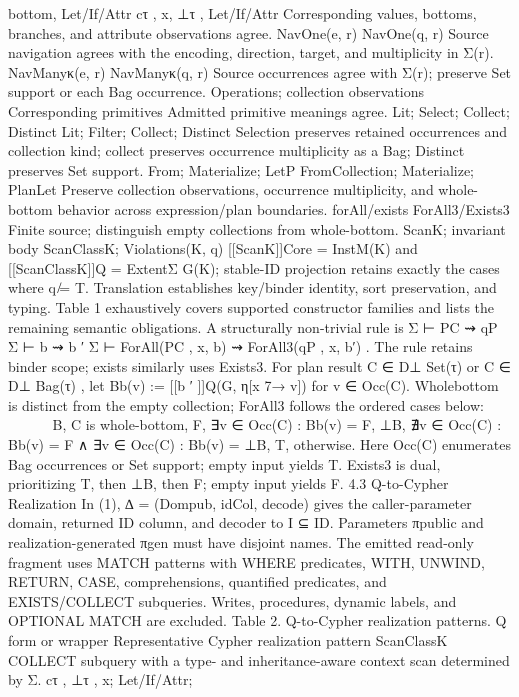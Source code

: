 bottom, Let/If/Attr
cτ , x, ⊥τ , Let/If/Attr Corresponding values, bottoms, branches, and attribute
observations agree.
NavOne(e, r) NavOne(q, r) Source navigation agrees with the encoding, direction, target,
and multiplicity in Σ(r).
NavManyκ(e, r) NavManyκ(q, r) Source occurrences agree with Σ(r); preserve Set support or
each Bag occurrence.
Operations; collection
observations
Corresponding primitives Admitted primitive meanings agree.
Lit; Select; Collect;
Distinct
Lit; Filter; Collect;
Distinct
Selection preserves retained occurrences and collection kind;
collect preserves occurrence multiplicity as a Bag; Distinct
preserves Set support.
From; Materialize; LetP FromCollection;
Materialize; PlanLet
Preserve collection observations, occurrence multiplicity, and
whole-bottom behavior across expression/plan boundaries.
forAll/exists ForAll3/Exists3 Finite source; distinguish empty collections from whole-bottom.
ScanK; invariant body ScanClassK;
Violations(K, q)
[[ScanK]]Core = InstM(K) and
[[ScanClassK]]Q = ExtentΣ
G(K); stable-ID projection retains
exactly the cases where q ̸= T.
Translation establishes key/binder identity, sort preservation, and typing. Table 1 exhaustively covers supported constructor families and lists the remaining semantic obligations. A structurally non-trivial rule is
Σ ⊢ PC ⇝ qP Σ ⊢ b ⇝ b
′
Σ ⊢ ForAll(PC , x, b) ⇝ ForAll3(qP , x, b′)
.
The rule retains binder scope; exists similarly uses Exists3. For plan result C ∈
D⊥
Set(τ)
or C ∈ D⊥
Bag(τ)
, let Bb(v) := [[b
′
]]Q(G, η[x 7→ v]) for v ∈ Occ(C). Wholebottom is distinct from the empty collection; ForAll3 follows the ordered cases below:



⊥B, C is whole-bottom,
F, ∃v ∈ Occ(C) : Bb(v) = F,
⊥B, ∄v ∈ Occ(C) : Bb(v) = F ∧ ∃v ∈ Occ(C) : Bb(v) = ⊥B,
T, otherwise.
Here Occ(C) enumerates Bag occurrences or Set support; empty input yields T. Exists3
is dual, prioritizing T, then ⊥B, then F; empty input yields F.
4.3 Q-to-Cypher Realization
In (1), ∆ = (Dompub, idCol, decode) gives the caller-parameter domain, returned ID
column, and decoder to I ⊆ ID. Parameters πpublic and realization-generated πgen must
have disjoint names.
The emitted read-only fragment uses MATCH patterns with WHERE predicates, WITH,
UNWIND, RETURN, CASE, comprehensions, quantified predicates, and EXISTS/COLLECT
subqueries. Writes, procedures, dynamic labels, and OPTIONAL MATCH are excluded.
Table 2. Q-to-Cypher realization patterns.
Q form or wrapper Representative Cypher realization pattern
ScanClassK COLLECT subquery with a type- and inheritance-aware context scan determined by Σ.
cτ , ⊥τ , x; Let/If/Attr;
